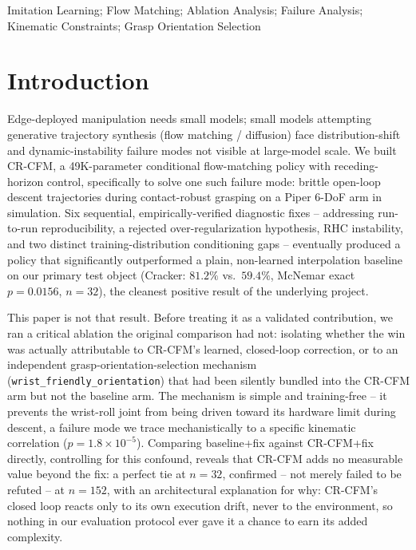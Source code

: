 \documentclass[]{interact}
\begin{document}
\begin{keywords}
Imitation Learning; Flow Matching; Ablation Analysis; Failure Analysis; Kinematic Constraints; Grasp Orientation Selection
\end{keywords}

\section{Introduction}
\label{sec:intro}

Edge-deployed manipulation needs small models; small models attempting generative trajectory
synthesis (flow matching / diffusion) face distribution-shift and dynamic-instability failure modes
not visible at large-model scale. We built CR-CFM, a 49K-parameter conditional flow-matching policy
with receding-horizon control, specifically to solve one such failure mode: brittle open-loop
descent trajectories during contact-robust grasping on a Piper 6-DoF arm in simulation. Six
sequential, empirically-verified diagnostic fixes -- addressing run-to-run reproducibility, a
rejected over-regularization hypothesis, RHC instability, and two distinct training-distribution
conditioning gaps -- eventually produced a policy that significantly outperformed a plain,
non-learned interpolation baseline on our primary test object (Cracker: $81.2\%$ vs.\ $59.4\%$,
McNemar exact $p=0.0156$, $n=32$), the cleanest positive result of the underlying project.

This paper is not that result. Before treating it as a validated contribution, we ran a critical
ablation the original comparison had not: isolating whether the win was actually attributable to
CR-CFM's learned, closed-loop correction, or to an independent grasp-orientation-selection mechanism
(\texttt{wrist\_friendly\_orientation}) that had been silently bundled into the CR-CFM arm but not
the baseline arm. The mechanism is simple and training-free -- it prevents the wrist-roll joint from
being driven toward its hardware limit during descent, a failure mode we trace mechanistically to a
specific kinematic correlation ($p=1.8\times10^{-5}$). Comparing baseline+fix against CR-CFM+fix
directly, controlling for this confound, reveals that CR-CFM adds no measurable value beyond the
fix: a perfect tie at $n=32$, confirmed -- not merely failed to be refuted -- at $n=152$, with an
architectural explanation for why: CR-CFM's closed loop reacts only to its own execution drift,
never to the environment, so nothing in our evaluation protocol ever gave it a chance to earn its
added complexity.
\end{document}
